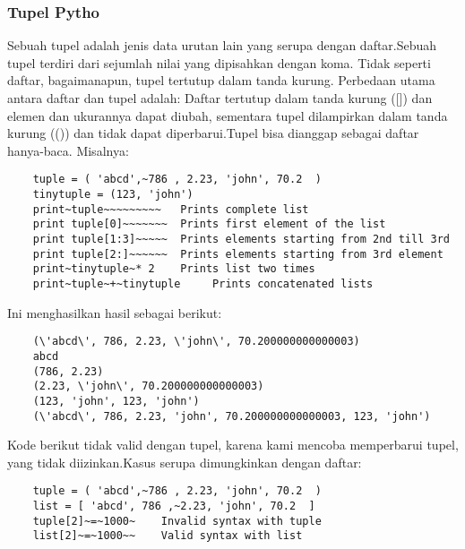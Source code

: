 \subsubsection{Tupel Pytho}
	Sebuah tupel adalah jenis data urutan lain yang serupa dengan daftar.Sebuah tupel terdiri dari sejumlah nilai yang dipisahkan dengan koma. Tidak seperti daftar, bagaimanapun, tupel tertutup dalam tanda kurung. 
Perbedaan utama antara daftar dan tupel adalah: Daftar tertutup dalam tanda kurung ([]) dan elemen dan ukurannya dapat diubah, sementara tupel dilampirkan dalam tanda kurung (()) dan tidak dapat diperbarui.Tupel bisa dianggap sebagai daftar hanya-baca. 
Misalnya:
\begin{verbatim}
	tuple = ( 'abcd',~786 , 2.23, 'john', 70.2  ) 
	tinytuple = (123, 'john') 
	print~tuple~~~~~~~~~   Prints complete list
	print tuple[0]~~~~~~~  Prints first element of the list 
	print tuple[1:3]~~~~~  Prints elements starting from 2nd till 3rd  
	print tuple[2:]~~~~~~  Prints elements starting from 3rd element 
	print~tinytuple~* 2    Prints list two times 
	print~tuple~+~tinytuple     Prints concatenated lists 
\end{verbatim}
Ini menghasilkan hasil sebagai berikut:
\begin{verbatim}
	(\'abcd\', 786, 2.23, \'john\', 70.200000000000003) 
	abcd  
	(786, 2.23) 
	(2.23, \'john\', 70.200000000000003) 
	(123, 'john', 123, 'john') 
	(\'abcd\', 786, 2.23, 'john', 70.200000000000003, 123, 'john')
\end{verbatim}
Kode berikut tidak valid dengan tupel, karena kami mencoba memperbarui tupel, yang tidak diizinkan.Kasus serupa dimungkinkan dengan daftar:
\begin{verbatim}
	tuple = ( 'abcd',~786 , 2.23, 'john', 70.2  ) 
	list = [ 'abcd', 786 ,~2.23, 'john', 70.2  ] 
	tuple[2]~=~1000~    Invalid syntax with tuple 
	list[2]~=~1000~~    Valid syntax with list 
\end{verbatim}

